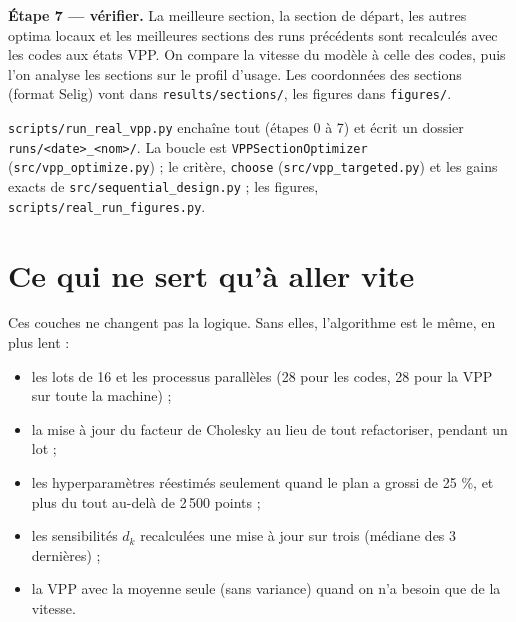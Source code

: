 \documentclass[11pt,a4paper]{article}
\newcommand{\py}[1]{\texttt{#1}}
\begin{document}
\textbf{Étape 7 — vérifier.} La meilleure section, la section de départ, les autres optima locaux et les
meilleures sections des runs précédents sont recalculés avec les codes aux états VPP. On compare la vitesse
du modèle à celle des codes, puis l'on analyse les sections sur le profil d'usage. Les coordonnées des
sections (format Selig) vont dans \py{results/sections/}, les figures dans \py{figures/}.

\begin{danslecode}
\py{scripts/run\_real\_vpp.py} enchaîne tout (étapes 0 à 7) et écrit un dossier \py{runs/<date>\_<nom>/}.
La boucle est \py{VPPSectionOptimizer} (\py{src/vpp\_optimize.py}) ; le critère, \py{choose}
(\py{src/vpp\_targeted.py}) et les gains exacts de \py{src/sequential\_design.py} ; les figures,
\py{scripts/real\_run\_figures.py}.
\end{danslecode}

\section{Ce qui ne sert qu'à aller vite}
Ces couches ne changent pas la logique. Sans elles, l'algorithme est le même, en plus lent :
\begin{itemize}
  \item les lots de 16 et les processus parallèles (28 pour les codes, 28 pour la VPP sur toute la machine) ;
  \item la mise à jour du facteur de Cholesky au lieu de tout refactoriser, pendant un lot ;
  \item les hyperparamètres réestimés seulement quand le plan a grossi de 25 \%, et plus du tout au-delà de
        2\,500 points ;
  \item les sensibilités $d_k$ recalculées une mise à jour sur trois (médiane des 3 dernières) ;
  \item la VPP avec la moyenne seule (sans variance) quand on n'a besoin que de la vitesse.
\end{itemize}

\end{document}
